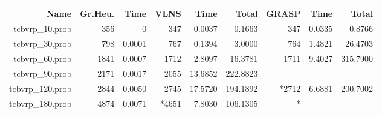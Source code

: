 \documentclass[a4paper]{scrartcl}
\begin{document}



\begin{tabular}{r | r | r | r | r | r | r | r | r}
\hline
Name & Gr.Heu. & Time &  VLNS & Time & Total & GRASP & Time & Total \\
\hline \hline 
tcbvrp\_10.prob & 356 & 0 & 347 & 0.0037 & 0.1663 & 347 & 0.0335 & 0.8766 \\
\hline
tcbvrp\_30.prob & 798 & 0.0001 & 767 & 0.1394 & 3.0000 & 764 & 1.4821 & 26.4703 \\
\hline
tcbvrp\_60.prob & 1841 & 0.0007 & 1712 & 2.8097 & 16.3781 & 1711 & 9.4027 & 315.7900 \\
\hline
tcbvrp\_90.prob & 2171 & 0.0017 & 2055 & 13.6852 & 222.8823 & \\
\hline
tcbvrp\_120.prob & 2844 & 0.0050 & 2745 & 17.5720 & 194.1892 & *2712 & 6.6881 & 200.7002 \\
\hline
tcbvrp\_180.prob & 4874 & 0.0071 & *4651 & 7.8030 & 106.1305 & *

\end{tabular}




\end{document}

